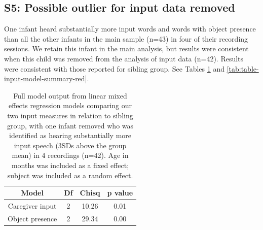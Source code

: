 \documentclass[
  man,floatsintext]{apa6}
\begin{document}
\newpage

\hypertarget{s5-possible-outlier-for-input-data-removed}{%
\subsection{S5: Possible outlier for input data removed}\label{s5-possible-outlier-for-input-data-removed}}

One infant heard substantially more input words and words with object presence than all the other infants in the main sample (n=43) in four of their recording sessions. We retain this infant in the main analysis, but results were consistent when this child was removed from the analysis of input data (n=42). Results were consistent with those reported for sibling group. See Tables \ref{tab:table-model-comparisons-red} and \ref{tab:table-input-model-summary-red}.

\begin{longtable}[t]{cccc}
\caption{\label{tab:table-model-comparisons-red}Full model output from linear mixed effects regression models comparing our two input measures in relation to sibling group, with one infant removed who was identified as hearing substantially more input speech (3SDs above the group mean) in 4 recordings (n=42). Age in months was included as a fixed effect; subject was included as a random effect.}\\
\toprule
Model & Df & Chisq & p value\\
\midrule
Caregiver input & 2 & 10.26 & 0.01\\
Object presence & 2 & 29.34 & 0.00\\
\bottomrule
\end{longtable}
\end{document}
